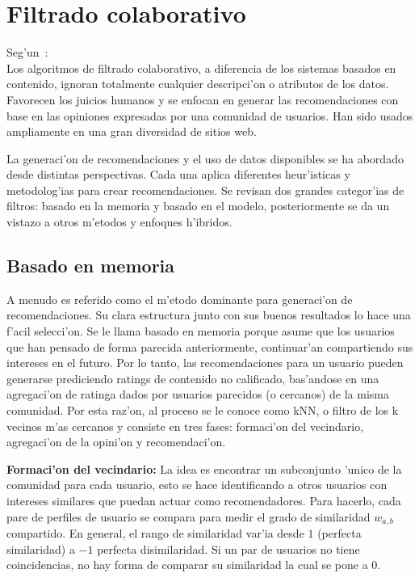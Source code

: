 \documentclass[11pt]{article}
\begin{document}
\section{Filtrado colaborativo}
Seg'un~\cite{recsys:nlathia}:\\
Los algoritmos de filtrado colaborativo, a diferencia de los sistemas basados en contenido, ignoran totalmente cualquier descripci'on o atributos de los datos. Favorecen los juicios humanos y se enfocan en generar las recomendaciones con base en las opiniones expresadas por una comunidad de usuarios. Han sido usados ampliamente en una gran diversidad de sitios web.

La generaci'on de recomendaciones y el uso de datos disponibles se ha abordado desde distintas perspectivas. Cada una aplica diferentes heur'isticas y metodolog'ias para crear recomendaciones. Se revisan dos grandes categor'ias de filtros: basado en la memoria y basado en el modelo, posteriormente se da un vistazo a otros m'etodos y enfoques h'ibridos.


\subsection{Basado en memoria}
A menudo es referido como el m'etodo dominante para generaci'on de recomendaciones. Su clara estructura junto con sus buenos resultados lo hace una f'acil selecci'on. Se le llama basado en memoria porque asume que los usuarios que han pensado de forma parecida anteriormente, continuar'an compartiendo sus intereses en el futuro. Por lo tanto, las recomendaciones para un usuario pueden generarse prediciendo ratings de contenido no calificado, bas'andose en una agregaci'on de ratinga dados por usuarios parecidos (o cercanos) de la misma comunidad. Por esta raz'on, al proceso se le conoce como kNN, o filtro de los k vecinos m'as cercanos y consiste en tres fases: formaci'on del vecindario, agregaci'on de la opini'on y recomendaci'on.

\smallskip
\textbf{Formaci'on del vecindario:} La idea es encontrar un subconjunto 'unico de la comunidad para cada usuario, esto se hace identificando a otros usuarios con intereses similares que puedan actuar como recomendadores. Para hacerlo, cada pare de perfiles de usuario se compara para medir el grado de similaridad $w_{a,b}$ compartido. En general, el rango de similaridad var'ia desde $1$ (perfecta similaridad) a $-1$ perfecta disimilaridad. Si un par de usuarios no tiene coincidencias, no hay forma de comparar su similaridad la cual se pone a $0$.
\end{document}

